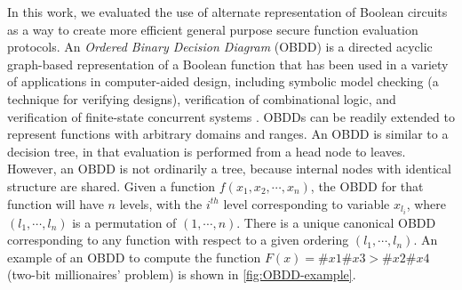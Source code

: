 In this work, we evaluated the use of alternate representation of
Boolean circuits as a way to create more efficient general purpose
secure function evaluation protocols. An \emph{Ordered Binary Decision
Diagram} (OBDD) is a directed acyclic graph-based representation of
a Boolean function that has been used in a variety of applications
in computer-aided design, including symbolic model checking (a technique
for verifying designs), verification of combinational logic, and verification
of finite-state concurrent systems \cite{Bryant:BDD,Clarke:book}.
OBDDs can be readily extended to represent functions with arbitrary
domains and ranges. An OBDD is similar to a decision tree, in that
evaluation is performed from a head node to leaves. However, an OBDD
is not ordinarily a tree, because internal nodes with identical structure
are shared. Given a function $f(x_{1},x_{2},\cdots,x_{n})$, the OBDD
for that function will have $n$ levels, with the $i^{th}$ level
corresponding to variable $x_{l_{i}}$, where $(l_{1},\cdots,l_{n})$
is a permutation of $(1,\cdots,n)$. There is a unique canonical OBDD
corresponding to any function with respect to a given ordering $(l_{1},\cdots,l_{n})$.
An example of an OBDD to compute the function $F(x)=\#x1\#x3>\#x2\#x4$
(two-bit millionaires' problem) is shown in \ref{fig:OBDD-example}.

